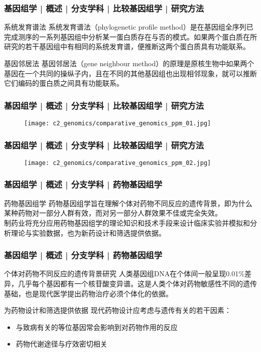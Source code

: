 \begin{frame}
  \frametitle{基因组学 | 概述 | 分支学科 | 比较基因组学 | 研究方法}
  \begin{block}{系统发育谱法}
系统发育谱法（phylogenetic profile method）是在基因组全序列已完成测序的一系列基因组中分析某一蛋白质存在与否的模式。如果两个蛋白质在所研究的若干基因组中有相同的系统发育谱，便推断这两个蛋白质具有功能联系。
  \end{block}
  \pause
  \begin{block}{基因邻居法}
    基因邻居法（gene neighbour method）的原理是原核生物中如果两个基因在一个共同的操纵子内，且在不同的其他基因组也出现相邻现象，就可以推断它们编码的蛋白质之间具有功能联系。
  \end{block}
\end{frame}

\begin{frame}
  \frametitle{基因组学 | 概述 | 分支学科 | 比较基因组学 | 研究方法}
  \begin{figure}
    \centering
    \texttt{[image: c2\_genomics/comparative\_genomics\_ppm\_01.jpg]}
  \end{figure}
\end{frame}

\begin{frame}
  \frametitle{基因组学 | 概述 | 分支学科 | 比较基因组学 | 研究方法}
  \begin{figure}
    \centering
    \texttt{[image: c2\_genomics/comparative\_genomics\_ppm\_02.jpg]}
  \end{figure}
\end{frame}

\begin{frame}
  \frametitle{基因组学 | 概述 | 分支学科 | 药物基因组学}
  \begin{block}{药物基因组学}
药物基因组学旨在理解个体对药物不同反应的遗传背景，即为什么某种药物对一部分人群有效，而对另一部分人群效果不佳或完全失效。\\
\vspace{1em}
制药业将充分应用药物基因组学的理论知识和技术手段来设计临床实验并模拟和分析理论与实验数据，也为新药设计和筛选提供依据。
  \end{block}
\end{frame}

\begin{frame}
  \frametitle{基因组学 | 概述 | 分支学科 | 药物基因组学}
  \begin{block}{个体对药物不同反应的遗传背景研究}
人类基因组DNA在个体间一般呈现0.01\%差异，几乎每个基因都有一个核苷酸变异谱。这是人类个体对药物敏感性不同的遗传基础，也是现代医学提出药物治疗必须个体化的依据。
  \end{block}
  \pause
  \begin{block}{为药物设计和筛选提供依据}
现代药物设计应考虑与遗传有关的若干因素：
\begin{itemize}
  \item 与致病有关的等位基因常会影响到对药物作用的反应
  \item 药物代谢途径与疗效密切相关
\end{itemize}
  \end{block}
\end{frame}

